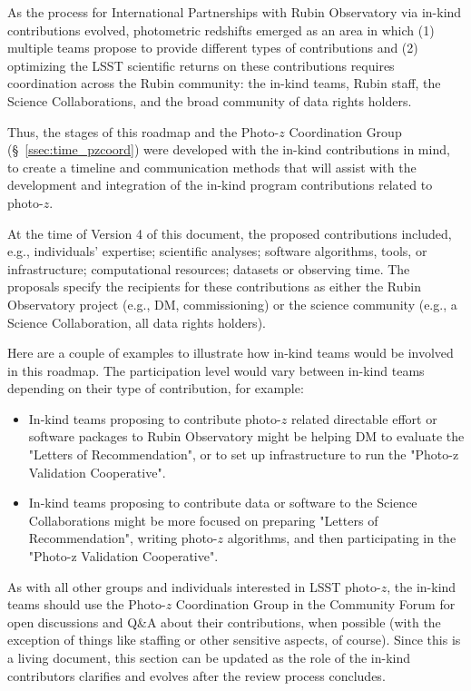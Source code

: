 \documentclass[DM,authoryear,toc]{lsstdoc}
\begin{document}
As the process for International Partnerships with Rubin Observatory via in-kind contributions evolved, photometric redshifts emerged as an area in which (1) multiple teams propose to provide different types of contributions and (2) optimizing the LSST scientific returns on these contributions requires coordination across the Rubin community: the in-kind teams, Rubin staff, the Science Collaborations, and the broad community of data rights holders.

Thus, the stages of this roadmap and the Photo-$z$ Coordination Group (\S~\ref{ssec:time_pzcoord}) were developed with the in-kind contributions in mind, to create a timeline and communication methods that will assist with the development and integration of the in-kind program contributions related to photo-$z$.

At the time of Version 4 of this document, the proposed contributions included, e.g., individuals' expertise; scientific analyses; software algorithms, tools, or infrastructure; computational resources; datasets or observing time.
The proposals specify the recipients for these contributions as either the Rubin Observatory project (e.g., DM, commissioning) or the science community (e.g., a Science Collaboration, all data rights holders).

Here are a couple of examples to illustrate how in-kind teams would be involved in this roadmap.
The participation level would vary between in-kind teams depending on their type of contribution, for example:
\begin{itemize}
\item In-kind teams proposing to contribute photo-$z$ related directable effort or software packages to Rubin Observatory might be helping DM to evaluate the "Letters of Recommendation", or to set up infrastructure to run the "Photo-z Validation Cooperative".
\item In-kind teams proposing to contribute data or software to the Science Collaborations might be more focused on preparing "Letters of Recommendation", writing photo-$z$ algorithms, and then participating in the "Photo-z Validation Cooperative".
\end{itemize}

As with all other groups and individuals interested in LSST photo-$z$, the in-kind teams should use the Photo-$z$ Coordination Group in the Community Forum for open discussions and Q\&A about their contributions, when possible (with the exception of things like staffing or other sensitive aspects, of course).
Since this is a living document, this section can be updated as the role of the in-kind contributors clarifies and evolves after the review process concludes.
\end{document}
